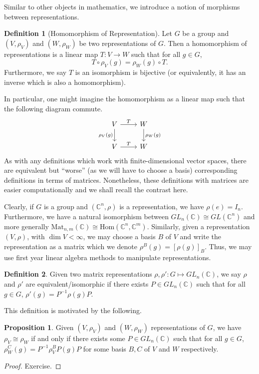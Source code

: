 \documentclass[]{article}
\theoremstyle{definition}
\theoremstyle{definition}
\newtheorem{definition}{Definition}[section]
\newtheorem{proposition}{Proposition}[section]
\begin{document}
Similar to other objects in mathematics, we introduce a notion of morphisms 
between representations.

\begin{definition}[Homomorphism of Representation]
  Let \(G\) be a group and \((V, \rho_V)\) and \((W, \rho_W)\) be two representations 
  of \(G\). Then a homomorphism of representations is a linear map 
  \(T : V \to W\) such that for all \(g \in G\),
  \[T \circ \rho_V(g) = \rho_W(g) \circ T.\]
  Furthermore, we say \(T\) is an isomorphism is bijective (or equivalently, 
  it has an inverse which is also a homomorphism).
\end{definition}

In particular, one might imagine the homomorphism as a linear map such that 
the following diagram commute.
\[\begin{tikzcd}
  V \arrow{r}{T} \arrow[swap]{d}{\rho_V(g)} & W \arrow{d}{\rho_W(g)} \\
  V \arrow{r}{T}& W
  \end{tikzcd}\]
As with any definitions which work with finite-dimensional vector spaces, 
there are equivalent but ``worse'' (as we will have to choose a basis) corresponding 
definitions in terms of matrices. Nonetheless, these definitions with matrices 
are easier computationally and we shall recall the contrast here.

Clearly, if \(G\) is a group and \((\mathbb{C}^n, \rho)\) is a representation, 
we have \(\rho(e) = I_n\). Furthermore, we have a natural isomorphism between 
\(GL_n(\mathbb{C}) \cong GL(\mathbb{C}^n)\) and more generally 
\(\text{Mat}_{n, m}(\mathbb{C}) \cong \text{Hom}(\mathbb{C}^n, \mathbb{C}^m)\).
Similarly, given a representation \((V, \rho)\), with \(\dim V < \infty\), we may 
choose a basis \(B\) of \(V\) and write the representation as a 
matrix which we denote \(\rho^B(g) = [\rho(g)]_B\). Thus, we may use first year 
linear algebra methods to manipulate representations. 

\begin{definition}
  Given two matrix representations \(\rho, \rho' : G \mapsto GL_n(\mathbb{C})\), 
  we say \(\rho\) and \(\rho'\) are equivalent/isomorphic if there exists 
  \(P \in GL_n(\mathbb{C})\) such that for all \(g \in G\), 
  \(\rho'(g) = P^{-1} \rho(g) P\).
\end{definition}
  
This definition is motivated by the following.

\begin{proposition}
  Given \((V, \rho_V)\) and \((W, \rho_W)\) representations of \(G\),
  we have \(\rho_V \cong \rho_W\) if and only if there exists some 
  \(P \in GL_n(\mathbb{C})\) such that for all \(g \in G\), 
  \(\rho_W^C(g) = P^{-1} \rho_V^BP(g) P\) for some basis \(B, C\) of \(V\) and 
  \(W\) respectively.
\end{proposition}
\begin{proof}
  Exercise.
\end{proof}
\end{document}
